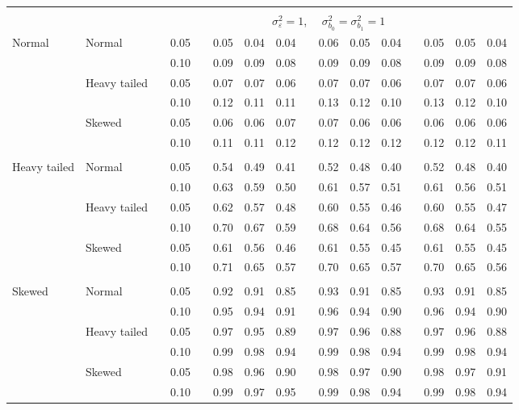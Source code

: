 \begin{table}[ht]
\begin{scriptsize}
\begin{tabular}{ll p{.1cm} c p{.1cm} rrr p{.1cm} rrr p{.1cm} rrr}
&&&&&&&&&&&&&&&\\
& && && \multicolumn{9}{c}{$\sigma_{\varepsilon}^2 = 1$, \ \ $\sigma_{b_0}^2 = \sigma_{b_1}^2 = 1$} \\ \cline{6-16}

\rowcolor{gray!20}Normal       & Normal       && 0.05 &&   0.05 & 0.04 & 0.04 && 0.06 & 0.05 & 0.04 && 0.05 & 0.05 & 0.04 \\ 
\rowcolor{gray!20}             &              && 0.10 &&   0.09 & 0.09 & 0.08 && 0.09 & 0.09 & 0.08 && 0.09 & 0.09 & 0.08 \\ 
\rowcolor{gray!20}             & Heavy tailed && 0.05 &&   0.07 & 0.07 & 0.06 && 0.07 & 0.07 & 0.06 && 0.07 & 0.07 & 0.06 \\ 
\rowcolor{gray!20}             &              && 0.10 &&   0.12 & 0.11 & 0.11 && 0.13 & 0.12 & 0.10 && 0.13 & 0.12 & 0.10 \\ 
\rowcolor{gray!20}             & Skewed       && 0.05 &&   0.06 & 0.06 & 0.07 && 0.07 & 0.06 & 0.06 && 0.06 & 0.06 & 0.06 \\ 
\rowcolor{gray!20}             &              && 0.10 &&   0.11 & 0.11 & 0.12 && 0.12 & 0.12 & 0.12 && 0.12 & 0.12 & 0.11 \\ 
             &&&&&&&&&&&&&&&\\
Heavy tailed & Normal       && 0.05 &&   0.54 & 0.49 & 0.41 && 0.52 & 0.48 & 0.40 && 0.52 & 0.48 & 0.40 \\ 
             &              && 0.10 &&   0.63 & 0.59 & 0.50 && 0.61 & 0.57 & 0.51 && 0.61 & 0.56 & 0.51 \\ 
             & Heavy tailed && 0.05 &&   0.62 & 0.57 & 0.48 && 0.60 & 0.55 & 0.46 && 0.60 & 0.55 & 0.47 \\ 
             &              && 0.10 &&   0.70 & 0.67 & 0.59 && 0.68 & 0.64 & 0.56 && 0.68 & 0.64 & 0.55 \\ 
             & Skewed       && 0.05 &&   0.61 & 0.56 & 0.46 && 0.61 & 0.55 & 0.45 && 0.61 & 0.55 & 0.45 \\ 
             &              && 0.10 &&   0.71 & 0.65 & 0.57 && 0.70 & 0.65 & 0.57 && 0.70 & 0.65 & 0.56 \\ 
             &&&&&&&&&&&&&&&\\
Skewed       & Normal       && 0.05 &&   0.92 & 0.91 & 0.85 && 0.93 & 0.91 & 0.85 && 0.93 & 0.91 & 0.85 \\ 
             &              && 0.10 &&   0.95 & 0.94 & 0.91 && 0.96 & 0.94 & 0.90 && 0.96 & 0.94 & 0.90 \\ 
             & Heavy tailed && 0.05 &&   0.97 & 0.95 & 0.89 && 0.97 & 0.96 & 0.88 && 0.97 & 0.96 & 0.88 \\ 
             &              && 0.10 &&   0.99 & 0.98 & 0.94 && 0.99 & 0.98 & 0.94 && 0.99 & 0.98 & 0.94 \\ 
             & Skewed       && 0.05 &&   0.98 & 0.96 & 0.90 && 0.98 & 0.97 & 0.90 && 0.98 & 0.97 & 0.91 \\ 
             &              && 0.10 &&   0.99 & 0.97 & 0.95 && 0.99 & 0.98 & 0.94 && 0.99 & 0.98 & 0.94 \\


\end{tabular}
\end{scriptsize}
\end{table}
